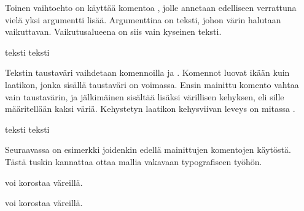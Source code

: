 \begin{koodilohkosis}
\color{nimi}                  %
\color[värimalli]{parametrit} %
\end{koodilohkosis}

Toinen vaihtoehto on käyttää komentoa , jolle
annetaan edelliseen verrattuna vielä yksi argumentti lisää. Argumenttina
on teksti, johon värin halutaan vaikuttavan. Vaikutusalueena on siis
vain kyseinen teksti.

\begin{koodilohkosis}
\textcolor{nimi}{teksti}
\textcolor[värimalli]{parametrit}{teksti}
\end{koodilohkosis}

Tekstin taustaväri vaihdetaan komennoilla  ja
. Komennot luovat ikään kuin laatikon, jonka sisällä
taustaväri on voimassa. Ensin mainittu komento vahtaa vain taustavärin,
ja jälkimäinen sisältää lisäksi värillisen kehyksen, eli sille
määritellään kaksi väriä. Kehystetyn laatikon kehysviivan leveys on
mitassa .

\begin{koodilohkosis}
\colorbox{nimi}{teksti} %
\colorbox[värimalli]{parametrit}{teksti}
\end{koodilohkosis}

Seuraavassa on esimerkki joidenkin edellä mainittujen komentojen
käytöstä. Tästä tuskin kannattaa ottaa mallia vakavaan typografiseen
työhön.

\begin{koodilohkosis}
 \setlength{\fboxrule}{2bp}
\textcolor{pun}{voi korostaa} \colorbox{pun}{väreillä}.
\end{koodilohkosis}

\begin{tulossis}
   \setlength{\fboxrule}{2bp}
  \textcolor{pun}{voi korostaa} \colorbox{pun}{väreillä}.
\end{tulossis}


